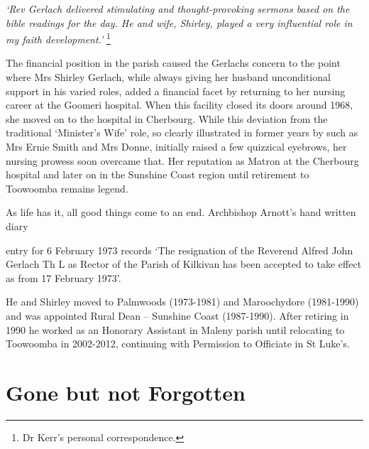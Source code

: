 \emph{`Rev Gerlach delivered stimulating and thought-provoking sermons based on the bible readings for the day. He and wife, Shirley, played a very influential role in my faith development.'} \footnote{Dr Kerr's personal correspondence.}


The financial position in the parish caused the Gerlachs concern to the point where Mrs Shirley Gerlach, while always giving her husband unconditional support in his varied roles, added a financial facet by returning to her nursing career at the Goomeri hospital. When this facility closed its doors around 1968, she moved on to the hospital in Cherbourg. While this deviation from the traditional `Minister's Wife' role, so clearly illustrated in former years by such as Mrs Ernie Smith and Mrs Donne, initially raised a few quizzical eyebrows, her nursing prowess soon overcame that. Her reputation as Matron at the Cherbourg hospital and later on in the Sunshine Coast region until retirement to Toowoomba remains legend.



As life has it, all good things come to an end. Archbishop Arnott's hand written diary



entry for 6 February 1973 records `The resignation of the Reverend Alfred John Gerlach Th L as Rector of the Parish of Kilkivan has been accepted to take effect as from 17 February 1973'.



He and Shirley moved to Palmwoods (1973-1981) and Maroochydore (1981-1990) and was appointed Rural Dean -- Sunshine Coast (1987-1990). After retiring in 1990 he worked as an Honorary Assistant in Maleny parish until relocating to Toowoomba in 2002-2012, continuing with Permission to Officiate in St Luke's.



\section{Gone but not Forgotten}



